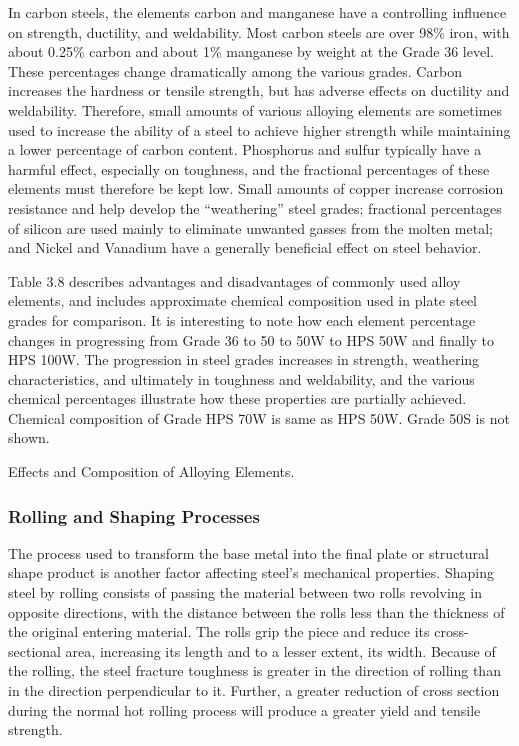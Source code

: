 In carbon steels, the elements carbon and manganese have a controlling influence on strength, ductility, and weldability. Most carbon steels are over 98\% iron, with about 0.25\% carbon and about 1\% manganese by weight at the Grade 36 level. These percentages change dramatically among the various grades. Carbon increases the hardness or tensile strength, but has adverse effects on ductility and weldability. Therefore, small amounts of various alloying elements are sometimes used to increase the ability of a steel to achieve higher strength while maintaining a lower percentage of carbon content. Phosphorus and sulfur typically have a harmful effect, especially on toughness, and the fractional percentages of these elements must therefore be kept low. Small amounts of copper increase corrosion resistance and help develop the “weathering” steel grades; fractional percentages of silicon are used mainly to eliminate unwanted gasses from the molten metal; and Nickel and Vanadium have a generally beneficial effect on steel behavior.

Table 3.8 describes advantages and disadvantages of commonly used alloy elements, and includes approximate
chemical composition used in plate steel grades for comparison. It is interesting to note how each element
percentage changes in progressing from Grade 36 to 50 to 50W to HPS 50W and finally to HPS 100W. The
progression in steel grades increases in strength, weathering characteristics, and ultimately in toughness and
weldability, and the various chemical percentages illustrate how these properties are partially achieved. Chemical
composition of Grade HPS 70W is same as HPS 50W. Grade 50S is not shown.

\begin{table}
  \caption{Effects and Composition of Alloying Elements.}\label{tab:effect-alloy-elements}
\end{table}

\subsubsection{Rolling and Shaping Processes}
The process used to transform the base metal into the final plate or structural shape product is another factor
affecting steel’s mechanical properties. Shaping steel by rolling consists of passing the material between two rolls
revolving in opposite directions, with the distance between the rolls less than the thickness of the original entering
material. The rolls grip the piece and reduce its cross-sectional area, increasing its length and to a lesser extent, its
width. Because of the rolling, the steel fracture toughness is greater in the direction of rolling than in the direction
perpendicular to it. Further, a greater reduction of cross section during the normal hot rolling process will produce a
greater yield and tensile strength.

